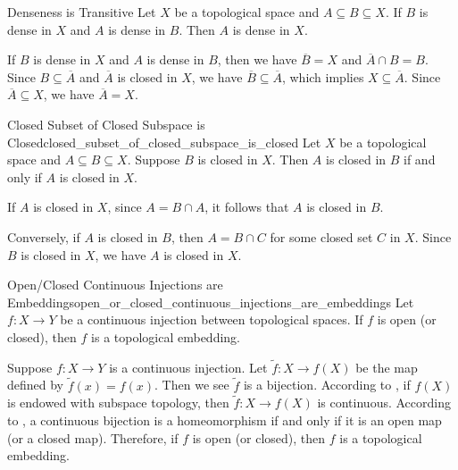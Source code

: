 \documentclass{report}
\begin{document}
\begin{proposition}{Denseness is Transitive}{}
	Let $X$ be a topological space and $A\subseteq B\subseteq X$. If $B$ is dense in $X$ and $A$ is dense in $B$. Then $A$ is dense in $X$.
\end{proposition}
\begin{prf}
	If $B$ is dense in $X$ and $A$ is dense in $B$, then we have $\overline{B}=X$ and $\overline{A}\cap B=B$. Since $B\subseteq \overline{A}$ and $\overline{A}$ is closed in $X$, we have $\overline{B}\subseteq \overline{A}$, which implies $X\subseteq \overline{A}$. Since $\overline{A}\subseteq X$, we have $\overline{A}=X$.
\end{prf}


\begin{proposition}{Closed Subset of Closed Subspace is Closed}{closed_subset_of_closed_subspace_is_closed}
	Let $X$ be a topological space and $A\subseteq B\subseteq X$. Suppose $B$ is closed in $X$. Then $A$ is closed in $B$ if and only if $A$ is closed in $X$.
\end{proposition}
\begin{prf}
	If $A$ is closed in $X$, since $A=B \cap A$, it follows that $A$ is closed in $B$.
	
	Conversely, if $A$ is closed in $B$, then $A=B\cap C$ for some closed set $C$ in $X$. Since $B$ is closed in $X$, we have $A$ is closed in $X$.
\end{prf}

\begin{proposition}{Open/Closed Continuous Injections are Embeddings}{open_or_closed_continuous_injections_are_embeddings}
	Let $f:X\to Y$ be a continuous injection between topological spaces. If $f$ is open (or closed), then $f$ is a topological embedding.
\end{proposition}
\begin{prf}
	Suppose $f:X\to Y$ is a continuous injection. Let $\tilde{f}:X\to f(X)$ be the map defined by $\tilde{f}(x)=f(x)$. Then we see $\tilde{f}$ is a bijection. According to , if $f(X)$ is endowed with subspace topology, then $\tilde{f}:X\to f(X)$ is continuous. According to , a continuous bijection is a homeomorphism if and only if it is an open map (or a closed map). Therefore, if $f$ is open (or closed), then $f$ is a topological embedding.
\end{prf}
\end{document}

